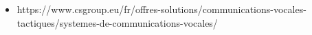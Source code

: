 \begin{frame}
    \begin{itemize}
        \item https://www.csgroup.eu/fr/offres-solutions/communications-vocales-tactiques/systemes-de-communications-vocales/
    \end{itemize}
\end{frame}